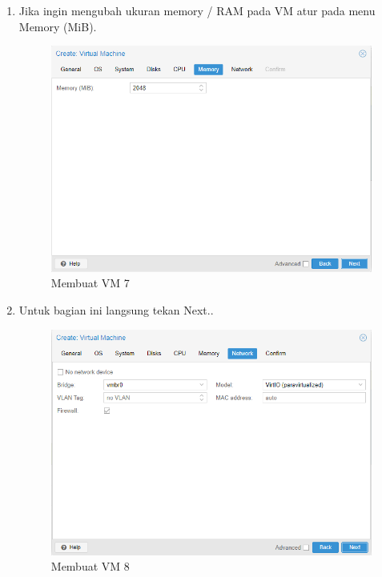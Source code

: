 \documentclass{article}
\begin{document}
\begin{enumerate}
  \item Jika ingin mengubah ukuran memory / RAM pada VM atur pada menu Memory (MiB).
  \begin{figure}[h!]
    \centering
    \includegraphics[width=0.7\linewidth]{create vm 7.png}
    \caption{Membuat VM 7}
  \end{figure}
  \item Untuk bagian ini langsung tekan Next..
  \begin{figure}[h!]
    \centering
    \includegraphics[width=0.7\linewidth]{create vm 8.png}
    \caption{Membuat VM 8}
  \end{figure}
  \newpage


\end{enumerate}
\end{document}
